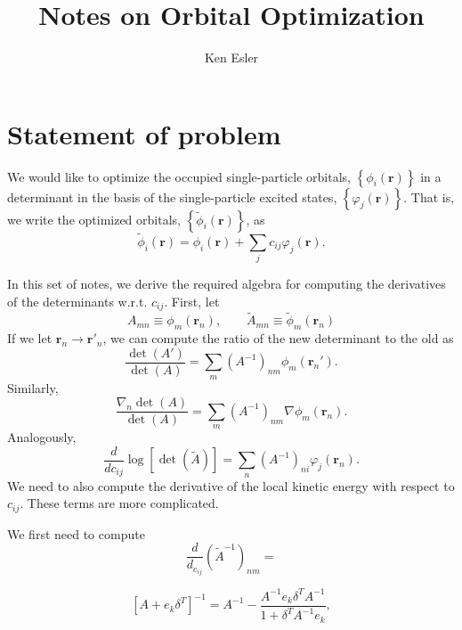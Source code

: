 \documentclass{article}
\title{Notes on Orbital Optimization}
\author{Ken Esler}
\begin{document}
\maketitle
\newcommand{\vr}{\mathbf{r}}
\newcommand{\Aopt}{\tilde{A}}
\section{Statement of problem}
We would like to optimize the occupied single-particle orbitals,
$\left\{\phi_i(\vr)\right\}$ in a determinant in the basis of the
single-particle excited states, $\left\{\varphi_j(\vr)\right\}$.
That is, we write the optimized orbitals,
$\left\{\tilde{\phi}_i(\vr)\right\}$, as
\begin{equation}
\tilde{\phi}_i(\vr) = \phi_i(\vr) + \sum_j c_{ij} \varphi_j(\vr).
\end{equation}

In this set of notes, we derive the required algebra for computing the
derivatives of the determinants w.r.t. $c_{ij}$.  First, let
\begin{equation}
A_{mn} \equiv \phi_m(\vr_n),\qquad \Aopt_{mn} \equiv \tilde{\phi}_m(\vr_n)
\end{equation}
If we let $\vr_n \rightarrow \vr'_n$, we can compute the ratio of the
new determinant to the old as
\begin{equation}
\frac{\det(A')}{\det(A)} = \sum_m \left(A^{-1}\right)_{nm} \phi_m(\vr_n').
\end{equation}
Similarly,
\begin{equation}
\frac{\nabla_n\det(A)}{\det(A)} = \sum_m \left(A^{-1}\right)_{nm} \nabla\phi_m(\vr_n).
\end{equation}
Analogously, 
\begin{equation}
\frac{d}{d c_{ij}} \log\left[\det(\Aopt)\right] = \sum_n
\left(A^{-1}\right)_{ni} \varphi_j(\vr_n).
\end{equation}
We need to also compute the derivative of the local kinetic energy
with respect to $c_{ij}$.  These terms are more complicated.  


We first need to compute
\begin{equation}
\frac{d}{d_{c_{ij}}} \left(\Aopt^{-1}\right)_{nm} = 
\end{equation}

\begin{equation}
\left[A + e_k\delta^T\right]^{-1} = A^{-1} - \frac{A^{-1}e_k\delta^T
  A^{-1}}{1 + \delta^T A^{-1}e_k},
\end{equation}
\end{document}
